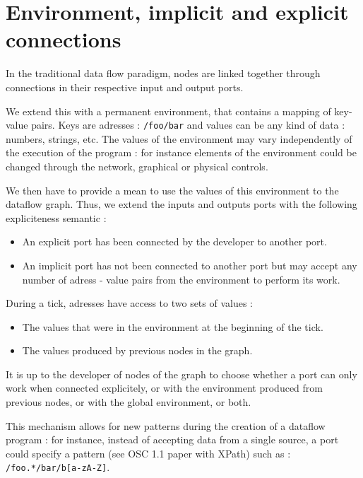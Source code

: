 \documentclass{article}
\begin{document}
	\section{Environment, implicit and explicit connections}
    In the traditional data flow paradigm, nodes are linked together through connections in their respective input and output ports.
    
    We extend this with a permanent environment, that contains a mapping of key-value pairs. 
    Keys are adresses : \lstinline|/foo/bar| and values can be any kind of data : numbers, strings, etc. 
    The values of the environment may vary independently of the execution of the program : for instance elements of the environment could be changed through the network, graphical or physical controls.
    
    We then have to provide a mean to use the values of this environment to the dataflow graph.
    Thus, we extend the inputs and outputs ports with the following expliciteness semantic : 
    
    \begin{itemize}
        \item An explicit port has been connected by the developer to another port.
        \item An implicit port has not been connected to another port but may accept any number of adress - value pairs from the environment to perform its work.
    \end{itemize}
    
    During a tick, adresses have access to two sets of values : 
    \begin{itemize}
        \item The values that were in the environment at the beginning of the tick.
        \item The values produced by previous nodes in the graph.
    \end{itemize}

    It is up to the developer of nodes of the graph to choose whether a port can only work when connected explicitely, or with the environment produced from previous nodes, or with the global environment, or both.

    This mechanism allows for new patterns during the creation of a dataflow program : for instance, instead of accepting data from a single source, a port could specify a pattern (see OSC 1.1 paper with XPath) such as : \lstinline|/foo.*/bar/b[a-zA-Z]|. 
	
\end{document}
